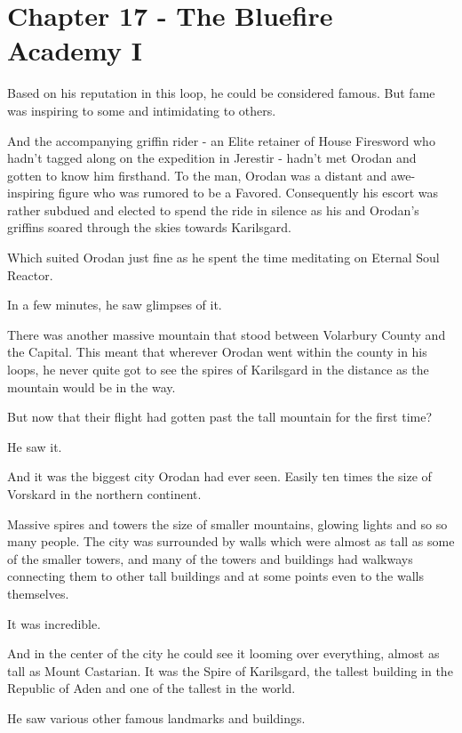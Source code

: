 \documentclass[a4paper,10pt]{book}
\begin{document}
\section*{Chapter 17 - The Bluefire Academy I}
%
\par
Based on his reputation in this loop, he could be considered famous. But fame was inspiring to some and intimidating to others.\par
And the accompanying griffin rider - an Elite retainer of House Firesword who hadn’t tagged along on the expedition in Jerestir - hadn’t met Orodan and gotten to know him firsthand. To the man, Orodan was a distant and awe-inspiring figure who was rumored to be a Favored. Consequently his escort was rather subdued and elected to spend the ride in silence as his and Orodan’s griffins soared through the skies towards Karilsgard.\par
Which suited Orodan just fine as he spent the time meditating on Eternal Soul Reactor.\par
In a few minutes, he saw glimpses of it.\par
There was another massive mountain that stood between Volarbury County and the Capital. This meant that wherever Orodan went within the county in his loops, he never quite got to see the spires of Karilsgard in the distance as the mountain would be in the way.\par
But now that their flight had gotten past the tall mountain for the first time?\par
He saw it.\par
And it was the biggest city Orodan had ever seen. Easily ten times the size of Vorskard in the northern continent.\par
Massive spires and towers the size of smaller mountains, glowing lights and so so many people. The city was surrounded by walls which were almost as tall as some of the smaller towers, and many of the towers and buildings had walkways connecting them to other tall buildings and at some points even to the walls themselves.\par
It was incredible.\par
And in the center of the city he could see it looming over everything, almost as tall as Mount Castarian. It was the Spire of Karilsgard, the tallest building in the Republic of Aden and one of the tallest in the world.\par
He saw various other famous landmarks and buildings.\par
\end{document}
